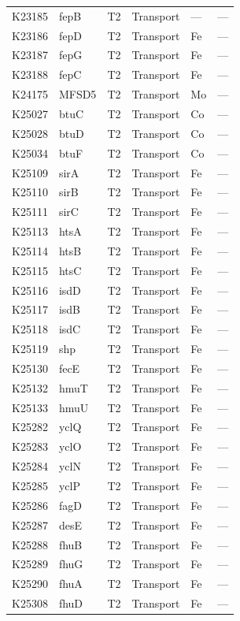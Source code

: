 \documentclass[11pt]{article}
\begin{document}
\begin{longtable}{@{}llllp{3.8cm}l@{}}
K23185 & fepB & T2 & Transport & --- & --- \\
K23186 & fepD & T2 & Transport & Fe & --- \\
K23187 & fepG & T2 & Transport & Fe & --- \\
K23188 & fepC & T2 & Transport & Fe & --- \\
K24175 & MFSD5 & T2 & Transport & Mo & --- \\
K25027 & btuC & T2 & Transport & Co & --- \\
K25028 & btuD & T2 & Transport & Co & --- \\
K25034 & btuF & T2 & Transport & Co & --- \\
K25109 & sirA & T2 & Transport & Fe & --- \\
K25110 & sirB & T2 & Transport & Fe & --- \\
K25111 & sirC & T2 & Transport & Fe & --- \\
K25113 & htsA & T2 & Transport & Fe & --- \\
K25114 & htsB & T2 & Transport & Fe & --- \\
K25115 & htsC & T2 & Transport & Fe & --- \\
K25116 & isdD & T2 & Transport & Fe & --- \\
K25117 & isdB & T2 & Transport & Fe & --- \\
K25118 & isdC & T2 & Transport & Fe & --- \\
K25119 & shp & T2 & Transport & Fe & --- \\
K25130 & fecE & T2 & Transport & Fe & --- \\
K25132 & hmuT & T2 & Transport & Fe & --- \\
K25133 & hmuU & T2 & Transport & Fe & --- \\
K25282 & yclQ & T2 & Transport & Fe & --- \\
K25283 & yclO & T2 & Transport & Fe & --- \\
K25284 & yclN & T2 & Transport & Fe & --- \\
K25285 & yclP & T2 & Transport & Fe & --- \\
K25286 & fagD & T2 & Transport & Fe & --- \\
K25287 & desE & T2 & Transport & Fe & --- \\
K25288 & fhuB & T2 & Transport & Fe & --- \\
K25289 & fhuG & T2 & Transport & Fe & --- \\
K25290 & fhuA & T2 & Transport & Fe & --- \\
K25308 & fhuD & T2 & Transport & Fe & --- \\

\end{longtable}
\end{document}
